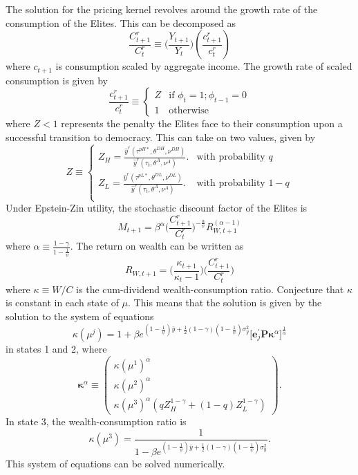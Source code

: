 The solution for the pricing kernel revolves around the growth rate of the consumption of the Elites. This can be decomposed as
\begin{equation}
\frac{C_{t+1}^r}{C_{t}^r} \equiv \bigg(\frac{Y_{t+1}}{Y_{t}}\bigg)\left(\frac{c_{t+1}^{r}}{c_{t}^{r}}\right)
\end{equation}
where $c_{t+1}$ is consumption scaled by aggregate income. The growth rate of scaled consumption is given by
\begin{equation}
\frac{c_{t+1}^{r}}{c_{t}^{r}}\equiv \begin{cases} 
Z & \textrm{if }\phi_{t}=1;\phi_{t-1}=0 \\
1 & \textrm{otherwise}
\end{cases} 
\end{equation}
where $Z<1$ represents the penalty the Elites face to their consumption upon a successful transition to democracy. This can take on two values, given by
\begin{equation}
Z \equiv \begin{cases} 
 Z_H = \frac{\hat{y}^{r} (\tau^{pH*},\theta^{DH},\nu^{DH})}{\hat{y}^{r} (\tau_t,\theta^{A},\nu^A)}. & \textrm{with probability }q \\
 Z_L = \frac{\hat{y}^{r} (\tau^{pL*},\theta^{DL},\nu^{DL})}{\hat{y}^{r} (\tau_t,\theta^{A},\nu^A)}. & \textrm{with probability } 1-q \\
\end{cases} 
\end{equation}
Under Epstein-Zin utility, the stochastic discount factor of the Elites is
\[
M_{t+1}=\beta^{\alpha}\bigg(\frac{C_{t+1}^r}{C_{t}^r}\bigg)^{-\frac{\alpha}{\psi}}R_{W,t+1}^{(\alpha-1)}
\]
where $\alpha \equiv \frac{1-\gamma}{1-\frac{1}{\psi}}$. The return on wealth can be written as
\begin{equation}
R_{W,t+1} = \bigg(\frac{\kappa_{t+1}}{\kappa_t - 1}\bigg)\bigg(\frac{C_{t+1}^r}{C_{t}^r}\bigg)
\end{equation}
where $\kappa \equiv W/C$ is the cum-dividend wealth-consumption ratio. Conjecture that $\kappa$ is constant in each state of $\mu$. This means that the solution is given by the solution to the system of equations
\begin{equation}
\kappa(\mu^j)=1+\beta e^{(1-\frac{1}{\psi})\bar{y}+\frac{1}{2}(1-\gamma)(1-\frac{1}{\psi})\sigma_y^2} \bigg[\mathbf{e}_j^\prime \mathbf{P}\boldsymbol\kappa^{\alpha}\bigg]^{\frac{1}{\alpha}}
\end{equation}
in states 1 and 2, where
\begin{equation}
\boldsymbol{\kappa}^{\alpha}\equiv\begin{pmatrix}\kappa(\mu^{1})^{\alpha}\\
\kappa(\mu^{2})^{\alpha}\\
\kappa(\mu^{3})^{\alpha}(qZ_H^{1-\gamma} + (1-q)Z_L^{1-\gamma})
\end{pmatrix}.
\end{equation}
In state 3, the wealth-consumption ratio is
$$
\kappa(\mu^{3})=\frac{1}{1-\beta e^{(1-\frac{1}{\psi})\bar{y}+\frac{1}{2}(1-\gamma)(1-\frac{1}{\psi})\sigma_y^{2}}}.
$$
This system of equations can be solved numerically.

